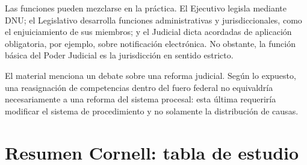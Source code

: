 \documentclass[12pt,oneside]{book}
\begin{document}
Las funciones pueden mezclarse en la práctica. El Ejecutivo legisla mediante DNU; el Legislativo desarrolla funciones administrativas y jurisdiccionales, como el enjuiciamiento de sus miembros; y el Judicial dicta acordadas de aplicación obligatoria, por ejemplo, sobre notificación electrónica. No obstante, la función básica del Poder Judicial es la jurisdicción en sentido estricto.

El material menciona un debate sobre una reforma judicial. Según lo expuesto, una reasignación de competencias dentro del fuero federal no equivaldría necesariamente a una reforma del sistema procesal: esta última requeriría modificar el sistema de procedimiento y no solamente la distribución de causas.

\chapter{Resumen Cornell: tabla de estudio}
\renewcommand{\arraystretch}{1.35}
\end{document}

